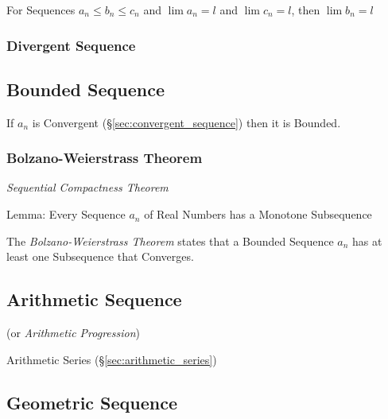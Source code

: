 For Sequences $a_n \leq b_n \leq c_n$ and $\lim a_n = l$ and $\lim c_n
= l$, then $\lim b_n = l$



\subsubsection{Divergent Sequence}\label{sec:divergent_sequence}



\subsection{Bounded Sequence}\label{sec:bounded_sequence}

If $a_n$ is Convergent (\S\ref{sec:convergent_sequence}) then it is
Bounded.



\subsubsection{Bolzano-Weierstrass Theorem}\label{sec:bolzano_weierstrass}

\emph{Sequential Compactness Theorem}

Lemma: Every Sequence $a_n$ of Real Numbers has a Monotone
Subsequence

The \emph{Bolzano-Weierstrass Theorem} states that a Bounded Sequence
$a_n$ has at least one Subsequence that Converges.



\subsection{Arithmetic Sequence}\label{sec:arithmetic_sequence}

(or \emph{Arithmetic Progression})

Arithmetic Series (\S\ref{sec:arithmetic_series})



\subsection{Geometric Sequence}\label{sec:geometric_sequence}

